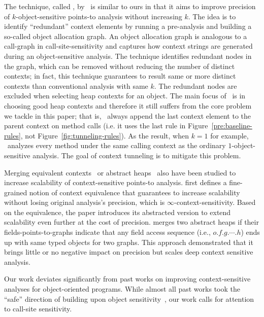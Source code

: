 The technique, called \Bean, by~\cite{TanLX16} is similar to ours in
that it aims to improve precision of $k$-object-sensitive points-to
analysis without increasing $k$. The idea is to identify ``redundant''
context elements by running a pre-analysis and building a so-called
object allocation graph. An object allocation graph is analogous to a
call-graph in call-site-sensitivity and captures how context strings
are generated during an object-sensitive analysis. The technique
identifies redundant nodes in the graph, which can be removed without
reducing the number of distinct contexts; in fact, this technique
guarantees to result same or more distinct contexts than conventional
analysis with same $k$. The redundant nodes are excluded when
selecting heap contexts for an object. The main focus of \Bean~is in
choosing good heap contexts and therefore it still suffers from the
core problem we tackle in this paper; that is, \Bean~always append the
last context element to the parent context on method calls (i.e. it
uses the last rule in Figure~\ref{pre:baseline-rules}, not
Figure~\ref{fig:tunneling-rules}). As the result, when $k=1$ for
example, \Bean~analyzes every method under the same calling context as
the ordinary $1$-object-sensitive analysis. The goal of context
tunneling is to mitigate this problem.

Merging equivalent contexts~\cite{Xu2008} or abstract heaps~\cite{Tan2017} also have been studied to
increase scalability of context-sensitive points-to analysis. \cite{Xu2008} first defines a fine-grained
notion of context equivalence that guarantees to increase scalability without losing original analysis's
precision, which is $\infty$-context-sensitivity. Based on the equivalence, the paper introduces its abstracted
version to extend scalability even further at the cost of precision. \cite{Tan2017} merges two
abstract heaps if their fields-points-to-graphs indicate that any field access sequence (i.e.,
$o.f.g.\cdots .h$) ends up with same typed objects for two graphs. This approach demonstrated that it brings
little or no negative impact on precision but scales deep context
sensitive analysis.










Our work deviates significantly from past works on improving context-sensitive analyses for object-oriented programs. 
While almost all past works took the ``safe'' direction of building upon object 
sensitivity~\cite{Smaragdakis2011,SridharanDCST12,TanLX16,Li2018b,Smaragdakis2014,Li2018a,JeJeChOh17,Liang2011,Liang2011learning,Lu:2019:PYF}, our
work calls for attention to call-site sensitivity.


